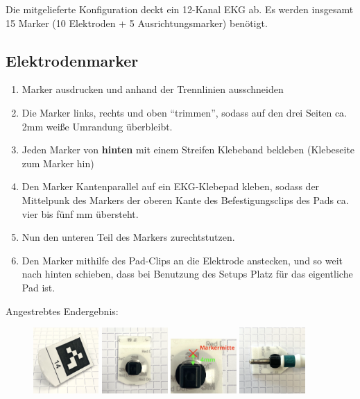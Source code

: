 \documentclass[a4paper, 10pt]{article}
\begin{document}
Die mitgelieferte Konfiguration deckt ein 12-Kanal EKG ab. Es werden insgesamt 15 Marker (10 Elektroden + 5 Ausrichtungsmarker) benötigt.

\subsection{Elektrodenmarker}
\label{ssec:electrode-markers}
\begin{enumerate}
    \item Marker ausdrucken und anhand der Trennlinien ausschneiden
    \item Die Marker links, rechts und oben \enquote{trimmen}, sodass auf den drei Seiten ca. 2mm weiße Umrandung überbleibt.
    \item Jeden Marker von \textbf{hinten} mit einem Streifen Klebeband bekleben (Klebeseite zum Marker hin)
    \item Den Marker Kantenparallel auf ein EKG-Klebepad kleben, sodass der Mittelpunk des Markers der oberen Kante des Befestigungsclips des Pads ca. vier bis fünf mm übersteht.
    \item Nun den unteren Teil des Markers zurechtstutzen.
    \item Den Marker mithilfe des Pad-Clips an die Elektrode anstecken, und so weit nach hinten schieben, dass bei Benutzung des Setups Platz für das eigentliche Pad ist.
\end{enumerate}

Angestrebtes Endergebnis:
\begin{figure}[H]
    \centering
    \includegraphics[width=2.5cm]{marker-front.png}
    \hspace*{5mm}
    \includegraphics[width=2.5cm]{marker-back.png}
    \hspace*{5mm}
    \includegraphics[width=2.5cm]{marker-back-zoomed.png}
    \hspace*{5mm}
    \includegraphics[width=2.5cm]{marker-attatched.png}
\end{figure}
\end{document}
